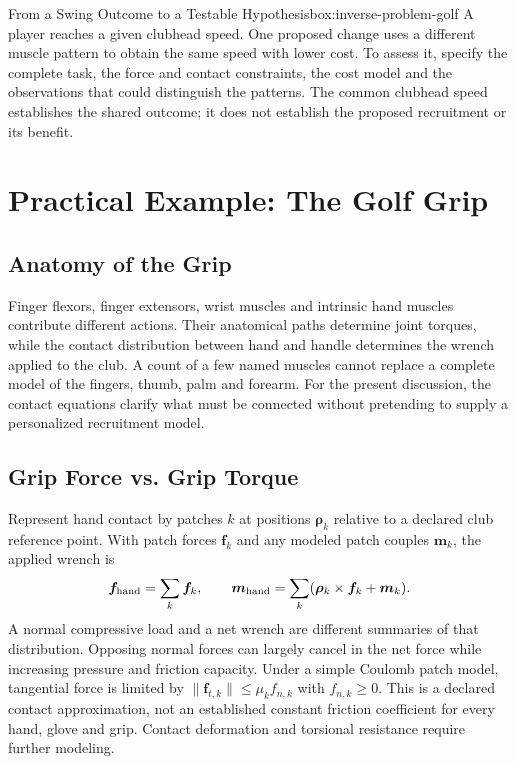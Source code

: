 \begin{laymansbox}{From a Swing Outcome to a Testable Hypothesis}{box:inverse-problem-golf}
A player reaches a given clubhead speed. One proposed change uses a different muscle pattern to obtain the same speed with lower cost. To assess it, specify the complete task, the force and contact constraints, the cost model and the observations that could distinguish the patterns. The common clubhead speed establishes the shared outcome; it does not establish the proposed recruitment or its benefit.
\end{laymansbox}

\section{Practical Example: The Golf Grip}
\label{sec:grip-forces}

\subsection{Anatomy of the Grip}

Finger flexors, finger extensors, wrist muscles and intrinsic hand muscles contribute different actions. Their anatomical paths determine joint torques, while the contact distribution between hand and handle determines the wrench applied to the club. A count of a few named muscles cannot replace a complete model of the fingers, thumb, palm and forearm. For the present discussion, the contact equations clarify what must be connected without pretending to supply a personalized recruitment model.

\subsection{Grip Force vs. Grip Torque}

Represent hand contact by patches $k$ at positions $\bm\rho_k$ relative to a declared club reference point. With patch forces $\bm f_k$ and any modeled patch couples $\bm m_k$, the applied wrench is
\[
\bm f_{\rm hand}=\sum_k\bm f_k,\qquad
\bm m_{\rm hand}=\sum_k(\bm\rho_k\times\bm f_k+\bm m_k).
\]
A normal compressive load and a net wrench are different summaries of that distribution. Opposing normal forces can largely cancel in the net force while increasing pressure and friction capacity. Under a simple Coulomb patch model, tangential force is limited by $\|\bm f_{t,k}\|\leq\mu_k f_{n,k}$ with $f_{n,k}\geq0$. This is a declared contact approximation, not an established constant friction coefficient for every hand, glove and grip. Contact deformation and torsional resistance require further modeling.

